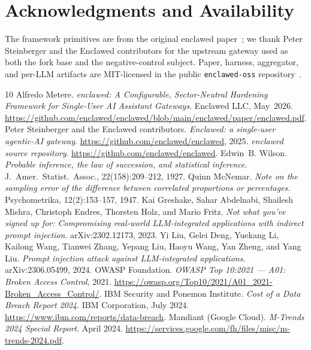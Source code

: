 \documentclass[11pt]{article}
\begin{document}
\section*{Acknowledgments and Availability}

The framework primitives are from the original enclawed
paper~\cite{Metere2026enclawed}; we thank Peter Steinberger and the
Enclawed contributors for the upstream gateway used as both the
fork base and the negative-control subject. Paper, harness,
aggregator, and per-LLM artifacts are MIT-licensed in the public
\texttt{enclawed-oss}
repository~\cite{enclawedRepo}.

{\footnotesize
\begin{thebibliography}{10}
Alfredo Metere.
\emph{enclawed: A Configurable, Sector-Neutral Hardening Framework for
Single-User AI Assistant Gateways}. Enclawed LLC, May~2026.
\url{https://github.com/enclawed/enclawed/blob/main/enclawed/paper/enclawed.pdf}.
Peter Steinberger and the Enclawed contributors.
\emph{Enclawed: a single-user agentic-AI gateway}.
\url{https://github.com/enclawed/enclawed}, 2025.
\emph{enclawed source repository}.
\url{https://github.com/enclawed/enclawed}.
Edwin~B. Wilson.
\emph{Probable inference, the law of succession, and statistical inference}.
J.~Amer.\ Statist.\ Assoc., 22(158):209--212, 1927.
Quinn McNemar.
\emph{Note on the sampling error of the difference between correlated
proportions or percentages}.
Psychometrika, 12(2):153--157, 1947.
Kai Greshake, Sahar Abdelnabi, Shailesh Mishra, Christoph Endres,
Thorsten Holz, and Mario Fritz.
\emph{Not what you've signed up for: Compromising real-world
LLM-integrated applications with indirect prompt injection}.
arXiv:2302.12173, 2023.
Yi Liu, Gelei Deng, Yuekang Li, Kailong Wang, Tianwei Zhang,
Yepang Liu, Haoyu Wang, Yan Zheng, and Yang Liu.
\emph{Prompt injection attack against LLM-integrated applications}.
arXiv:2306.05499, 2024.
OWASP Foundation.
\emph{OWASP Top 10:2021 --- A01: Broken Access Control}, 2021.
\url{https://owasp.org/Top10/2021/A01_2021-Broken_Access_Control/}.
IBM Security and Ponemon Institute.
\emph{Cost of a Data Breach Report 2024}. IBM Corporation, July 2024.
\url{https://www.ibm.com/reports/data-breach}.
Mandiant (Google Cloud).
\emph{M-Trends 2024 Special Report}. April 2024.
\url{https://services.google.com/fh/files/misc/m-trends-2024.pdf}.
\end{thebibliography}
}
\end{document}
